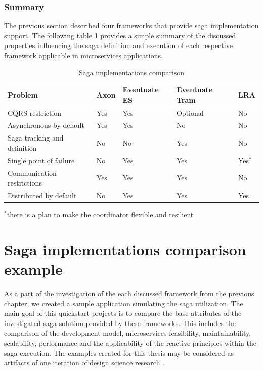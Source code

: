 \documentclass[oneside,
  digital, %
  table,   %
  lof,     %
  lot,     %
]{fithesis3}
\begin{document}
\subsection{Summary}

The previous section described four frameworks that provide saga implementation support. The following table \ref{tab:saga-implementations-comparison} provides a simple summary of the discussed properties influencing the saga definition and execution of each respective framework applicable in microservices applications. 

\begin{table}[ht]
    \begin{tabularx}{\textwidth}{p{4cm}XXXX}
        \toprule
        Problem & Axon & Eventuate ES & Eventuate Tram & LRA\\
        \midrule
        CQRS restriction & Yes & Yes & Optional & No \\
        Asynchronous by \newline default & Yes & Yes & No & No \\
        Saga tracking and \newline definition & No & No & Yes & No\\
        Single point of failure & No & Yes & Yes & Yes$^*$\\
        Communication restrictions & Yes & Yes & Yes & No\\
        Distributed by default & No & Yes & Yes & Yes\\
        \bottomrule
    \end{tabularx}
    \caption{Saga implementations comparison}
    \label{tab:saga-implementations-comparison}
    \bigskip
    $^*$there is a plan to make the coordinator flexible and resilient
\end{table}



\clearpage
\chapter{Saga implementations comparison example}

As a part of the investigation of the each discussed framework from the previous chapter, we created a sample application simulating the saga utilization. The main goal of this quickstart projects is to compare the base attributes of the investigated saga solution provided by these frameworks. This includes the comparison of the development model, microservices feasibility, maintainability, scalability, performance and the applicability of the reactive principles within the saga execution. The examples created for this thesis may be considered as artifacts of one iteration of design science research \cite{design_science}.
\end{document}
